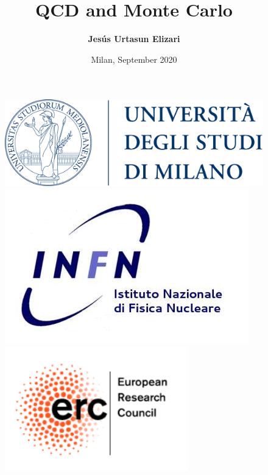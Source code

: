 \documentclass[aspectratio=43]{beamer}
\title[QCD and Monte Carlo]{QCD and Monte Carlo}
\author{\textbf {Jes\'us Urtasun Elizari}}
\date{Milan, September 2020}
\begin{document}
\begin{frame}

	\vspace{1.0 cm}
	
	
	\vspace{0.25 cm}

	\begin{figure}
		\includegraphics[width = 3.0 cm]{plots/logo_unimi.png}
		\hfill
		\includegraphics[width = 3.0 cm]{plots/logo_infn.png}
		\hfill
		\includegraphics[width = 3.0 cm]{plots/logo_erc.png}
		\endminipage
	\end{figure}

	\vspace{1.0 cm}

\end{frame}
\end{document}
